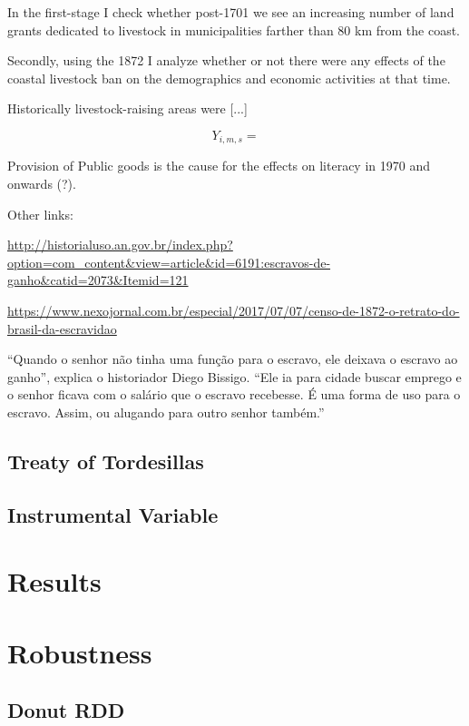 \documentclass{article}
\begin{document}
In the first-stage I check whether post-1701 we see an increasing number of land grants dedicated to livestock in municipalities farther than 80 km from the coast. 

Secondly, using the 1872 I analyze whether or not there were any effects of the coastal livestock ban on the demographics and economic activities at that time.




Historically livestock-raising areas were [...]

\begin{equation}
  Y_{i,m,s} = 
\end{equation}

Provision of Public goods is the cause for the effects on literacy in 1970 and onwards (?).

Other links:

\url{http://historialuso.an.gov.br/index.php?option=com_content&view=article&id=6191:escravos-de-ganho&catid=2073&Itemid=121}

\url{https://www.nexojornal.com.br/especial/2017/07/07/censo-de-1872-o-retrato-do-brasil-da-escravidao}

“Quando o senhor não tinha uma função para o escravo, ele deixava o escravo ao ganho”, explica o historiador Diego Bissigo. “Ele ia para cidade buscar emprego e o senhor ficava com o salário que o escravo recebesse. É uma forma de uso para o escravo. Assim, ou alugando para outro senhor também.”



\parencite[p.~142]{De_Oliveira_Andrade1980-xz}

\subsection{Treaty of Tordesillas}

\subsection{Instrumental Variable}

\section{Results}



\section{Robustness}
\subsection{Donut RDD}
\end{document}
